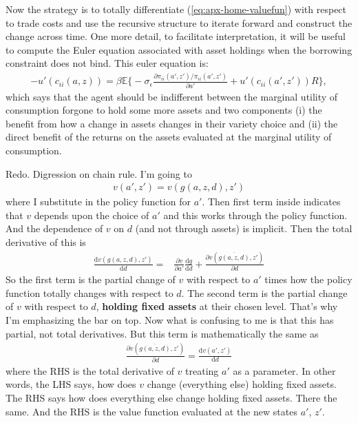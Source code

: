 \documentclass[12pt,pdftex]{article}
\begin{document}
\begin{onehalfspacing}
Now the strategy is to totally differentiate (\ref{eq:apx-home-valuefun}) with respect to trade costs and use the recursive structure to iterate forward and construct the change across time.  One more detail, to facilitate interpretation, it will be useful to compute the Euler equation associated with asset holdings when the borrowing constraint does not bind. This euler equation is:
\begin{align}
-u'(c_{ii}(a,z)) = \beta \mathbb{E} \bigg \{ -\sigma_{\epsilon} \frac{\partial \pi_{ii}(a',z') / \pi_{ii}(a',z')}{\partial a'} + u'(c_{ii}(a',z'))R \bigg \},
\end{align}
which says that the agent should be indifferent between the marginal utility of consumption forgone to hold some more assets and two components (i) the benefit from how a change in assets changes in their variety choice and (ii) the direct benefit of the returns on the assets evaluated at the marginal utility of consumption.

\hrulefill

Redo. Digression on chain rule. I'm going to
\begin{align}
v(a',z') = v(g(a,z,d), z')
\end{align}
where I substitute in the policy function for $a'$. Then first term inside indicates that $v$ depends upon the choice of $a'$ and this works through the policy function. And the dependence of $v$ on $d$ (and not through assets) is implicit. Then the total derivative of this is
\begin{align}
\frac{\mathrm{d} v(g(a,z,d), z')}{\mathrm{d} d} =& \frac{\partial v}{\partial a'}\frac{\mathrm{d}g}{\mathrm{d}d} +  \frac{\partial v(\overline{g(a,z,d)},z')}{\partial d}
\end{align}
So the first term is the partial change of $v$ with respect to $a'$ times how the policy function totally changes with respect to $d$. The second term is the partial change of $v$ with respect to $d$, \textbf{holding fixed assets} at their chosen level. That's why I'm emphasizing the bar on top. Now what is confusing to me is that this has partial, not total derivatives. But this term is mathematically the same as
\begin{align}
\frac{\partial v(\overline{g(a,z,d)},z')}{\partial d} = \frac{\mathrm{d} v(a', z')}{\mathrm{d} d }
\end{align}
where the RHS is the total derivative of $v$ treating $a'$ as a parameter. In other words, the LHS says, how does $v$ change (everything else) holding fixed assets. The RHS says how does everything else change holding fixed assets. There the same. And the RHS is the value function evaluated at the new states $a'$, $z'$.


\end{onehalfspacing}
\end{document}
